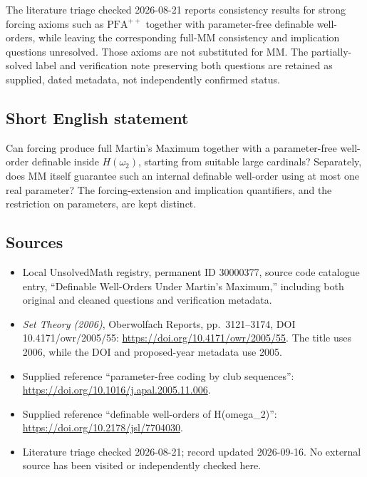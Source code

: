 \documentclass[11pt]{article}
\begin{document}
The literature triage checked 2026-08-21 reports consistency results for strong forcing axioms such as \(\mathrm{PFA}^{++}\) together with parameter-free definable well-orders, while leaving the corresponding full-MM consistency and implication questions unresolved. Those axioms are not substituted for MM. The partially-solved label and verification note preserving both questions are retained as supplied, dated metadata, not independently confirmed status.
\subsection{Short English statement}
Can forcing produce full Martin's Maximum together with a parameter-free well-order definable inside \(H(\omega_2)\), starting from suitable large cardinals? Separately, does MM itself guarantee such an internal definable well-order using at most one real parameter? The forcing-extension and implication quantifiers, and the restriction on parameters, are kept distinct.
\subsection{Sources}
\begin{itemize}
\item Local UnsolvedMath registry, permanent ID 30000377, source code catalogue entry, ``Definable Well-Orders Under Martin's Maximum,'' including both original and cleaned questions and verification metadata.
\item \emph{Set Theory (2006)}, Oberwolfach Reports, pp.\ 3121--3174, DOI 10.4171/owr/2005/55: \url{https://doi.org/10.4171/owr/2005/55}. The title uses 2006, while the DOI and proposed-year metadata use 2005.
\item Supplied reference ``parameter-free coding by club sequences'': \url{https://doi.org/10.1016/j.apal.2005.11.006}.
\item Supplied reference ``definable well-orders of H(omega\_2)'': \url{https://doi.org/10.2178/jsl/7704030}.
\item Literature triage checked 2026-08-21; record updated 2026-09-16. No external source has been visited or independently checked here.
\end{itemize}
\end{document}
